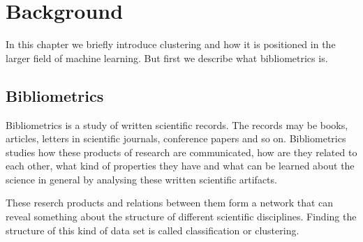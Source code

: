 \chapter{Background}
\label{chapter:background}

% 


In this chapter we briefly introduce clustering and how it is 
positioned in the larger field of machine learning. But first we
describe what bibliometrics is.

\section{Bibliometrics}
\label{sec:bibliometrics}

Bibliometrics is a study of written scientific records. The 
records may be books, articles, letters in scientific journals, 
conference papers and so on. Bibliometrics studies how these 
products of research are communicated, how are they related to 
each other, what kind of properties they have and what can be 
learned about the science in general by analysing these written 
scientific artifacts.

These reserch products and relations between them form a 
network that can reveal something about the structure of 
different scientific disciplines. Finding the structure of this 
kind of data set is called classification or clustering.


